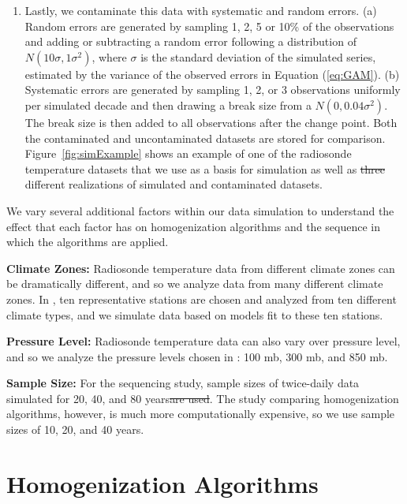 \documentclass[12pt]{article}
\providecommand{\DIFaddtex}[1]{{\protect\color{blue}\uwave{#1}}} %
\providecommand{\DIFdeltex}[1]{{\protect\color{red}\sout{#1}}}                      %
\providecommand{\DIFaddbegin}{} %
\providecommand{\DIFaddend}{} %
\providecommand{\DIFdelbegin}{} %
\providecommand{\DIFdelend}{} %
\providecommand{\DIFadd}[1]{\texorpdfstring{\DIFaddtex{#1}}{#1}} %
\providecommand{\DIFdel}[1]{\texorpdfstring{\DIFdeltex{#1}}{}} %
\begin{document}
\begin{doublespacing}
\begin{enumerate}
	\item Lastly, we contaminate this data with systematic and random errors.  (a) Random errors are generated by sampling 1, 2, 5 or 10\% of the observations and adding or subtracting a random error following a distribution of $N(10\sigma,1\sigma^2)$, where $\sigma$ is the standard deviation of the simulated series, estimated by the variance of the observed errors in Equation (\ref{eq:GAM}).  (b) Systematic errors are generated by sampling 1, 2, or 3 observations uniformly per simulated decade and then drawing a break size from a $N(0,0.04 \sigma^2)$.  The break size is then added to all observations after the change point.  Both the contaminated and uncontaminated datasets are stored for comparison.  Figure~\ref{fig:simExample} shows an example of one of the radiosonde temperature datasets that we use as a basis for simulation as well as \DIFdelbegin \DIFdel{three }\DIFdelend \DIFaddbegin \DIFadd{two }\DIFaddend different realizations of simulated and contaminated datasets.
\end{enumerate}

We vary several additional factors within our data simulation to understand the effect that each factor has on homogenization algorithms and the sequence in which the algorithms are applied.

\textbf{Climate Zones:} Radiosonde temperature data from different climate zones can be dramatically different, and so we analyze data from many different climate zones.  In \cite{bell14}, ten representative stations are chosen and analyzed from ten different climate types, and we simulate data based on models fit to these ten stations.

\textbf{Pressure Level:} Radiosonde temperature data can also vary  over pressure level, and so we analyze the pressure levels chosen in \cite{bell14}: 100 mb, 300 mb, and 850 mb.

\textbf{Sample Size:}  For the sequencing study, sample sizes of twice-daily data \DIFaddbegin \DIFadd{are }\DIFaddend simulated for 20, 40, and 80 years\DIFdelbegin \DIFdel{are used}\DIFdelend .  The study comparing homogenization algorithms, however, is much more computationally expensive, so we use sample sizes of 10, 20, and 40 years.

\section{Homogenization Algorithms}


\end{doublespacing}
\end{document}

